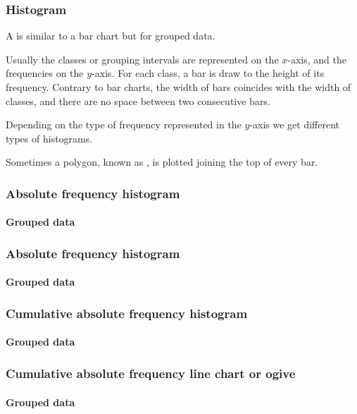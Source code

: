 \begin{frame}
\frametitle{Histogram}
A  is similar to a bar chart but for grouped data.  

Usually the classes or grouping intervals are represented on the $x$-axis, and the frequencies on the $y$-axis. 
For each class, a bar is draw to the height of its frequency.
Contrary to bar charts, the width of bars coincides with the width of classes, and there are no space between two
consecutive bars.

Depending on the type of frequency represented in the $y$-axis we get different types of histograms.
 
Sometimes a polygon, known as , is plotted joining the top of every bar.
\end{frame}


\begin{frame}
\frametitle{Absolute frequency histogram}
\framesubtitle{Grouped data}
\begin{center}
\scalebox{0.6}{}
\end{center} 
\end{frame}


\begin{frame}
\frametitle{Absolute frequency histogram}
\framesubtitle{Grouped data}
\begin{center}
\scalebox{0.6}{} 
\end{center} 
\end{frame}


\begin{frame}
\frametitle{Cumulative absolute frequency histogram}
\framesubtitle{Grouped data}
\begin{center}
\scalebox{0.6}{}
\end{center} 
\end{frame}


\begin{frame}
\frametitle{Cumulative absolute frequency line chart or ogive}
\framesubtitle{Grouped data}
\begin{center}
\scalebox{0.6}{} 
\end{center} 
\end{frame}


